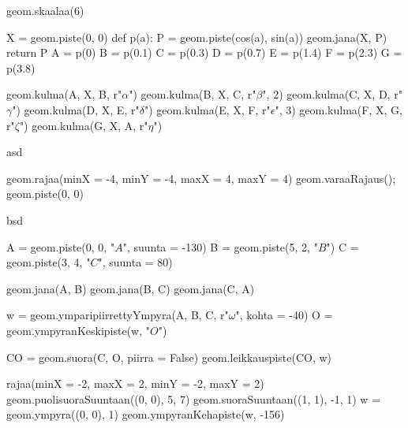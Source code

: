 \begin{kuva}
geom.skaalaa(6)

X = geom.piste(0, 0)
def p(a):
	P = geom.piste(cos(a), sin(a))
	geom.jana(X, P)
	return P
A = p(0)
B = p(0.1)
C = p(0.3)
D = p(0.7)
E = p(1.4)
F = p(2.3)
G = p(3.8)

geom.kulma(A, X, B, r"$\alpha$")
geom.kulma(B, X, C, r"$\beta$", 2)
geom.kulma(C, X, D, r"$\gamma$")
geom.kulma(D, X, E, r"$\delta$")
geom.kulma(E, X, F, r"$\epsilon$", 3)
geom.kulma(F, X, G, r"$\zeta$")
geom.kulma(G, X, A, r"$\eta$")
\end{kuva}

asd

\begin{kuva}
geom.rajaa(minX = -4, minY = -4, maxX = 4, maxY = 4)
geom.varaaRajaus();
geom.piste(0, 0)
\end{kuva}

bsd


\begin{kuva}
A = geom.piste(0, 0, "$A$", suunta = -130)
B = geom.piste(5, 2, "$B$")
C = geom.piste(3, 4, "$C$", suunta = 80)

geom.jana(A, B)
geom.jana(B, C)
geom.jana(C, A)

w = geom.ymparipiirrettyYmpyra(A, B, C, r"$\omega$", kohta = -40)
O = geom.ympyranKeskipiste(w, "$O$")

CO = geom.suora(C, O, piirra = False)
geom.leikkauspiste(CO, w)
\end{kuva}

\begin{kuva}
rajaa(minX = -2, maxX = 2, minY = -2, maxY = 2)
geom.puolisuoraSuuntaan((0, 0), 5, 7)
geom.suoraSuuntaan((1, 1), -1, 1)
w = geom.ympyra((0, 0), 1)
geom.ympyranKehapiste(w, -156)
\end{kuva}
